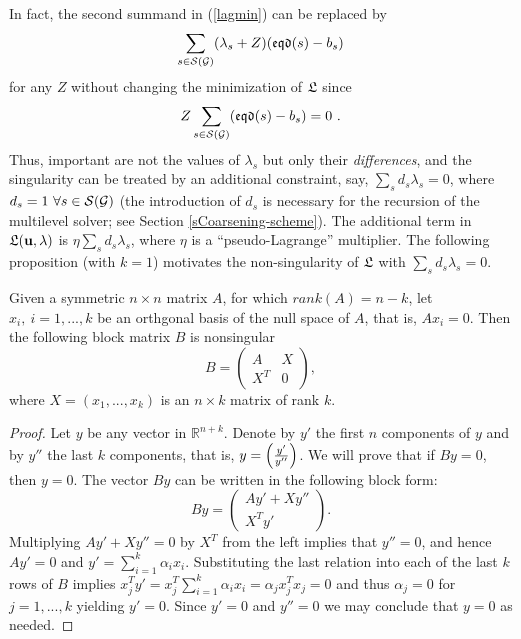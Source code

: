 \documentclass[final]{siamltex}
\begin{document}
In fact, the second summand in (\ref{lagmin})
can be replaced by
\[
\sum_{s\in  \mathcal{S}(\mathcal{G})} (\lambda_s+Z)(\mathfrak{eqd}(s)-b_s)
\]
for any $Z$ without changing the minimization of $\mathfrak{L}$ since
\[
Z\sum_{s\in  \mathcal{S}(\mathcal{G})} (\mathfrak{eqd}(s)-b_s)=0~.
\]
Thus, important are not the values of $\lambda_s$ but only their
{\it differences}, and the singularity can be treated by an
additional constraint, say, $\sum_s d_s \lambda_s=0$, where $d_s=1~
\forall s \in \mathcal{S}(\mathcal{G})$ (the introduction of $d_s$ is necessary for
the recursion of the multilevel solver; see Section
\ref{sCoarsening-scheme}). The additional term in
$\mathfrak{L}({\bf u},\lambda)$ is $\eta \sum_s d_s \lambda_s$, where $\eta$
is a ``pseudo-Lagrange'' multiplier. The following proposition
(with $k=1$) motivates the non-singularity of $\mathfrak{L}$ with $\sum_s
d_s \lambda_s=0$.
\begin{proposition}
Given a symmetric $n\times n$ matrix $A$, for which $rank(A)=n-k$, let $x_i,~ i=1,...,k$ be an orthgonal basis of the null space of
$A$, that is, $Ax_i=0$. Then the following block matrix $B$ is
nonsingular
\[
B=\left(
\begin{array}{c|c}
 A      & X \\
\hline
 X^T  & 0
\end{array}\right),
\]
where $X=(x_1,...,x_k)$ is an $n\times k$ matrix of rank $k$.
\end{proposition}
\vspace{3mm}
\begin{proof}
Let $y$ be any vector in $\mathbb{R}^{n+k}$. Denote by $y'$ the
first $n$ components of $y$ and by $y''$ the last $k$ components,
that is, $y=\left( {y'}\over{y''} \right)$. We will prove that if
$By=0$, then $y=0$. The vector $By$ can be written in the following
block form:
\[
By=\left(
\begin{array}{c}
 Ay'+Xy''\\
\hline
 X^Ty'
\end{array}\right).
\]
Multiplying $Ay'+Xy''=0$ by $X^T$ from the left implies that
$y''=0$, and hence $Ay'=0$ and $y'=\sum_{i=1}^k \alpha_i x_i$.
Substituting the last relation into each of the last $k$ rows of
$B$ implies $x_j^Ty'=x_j^T \sum_{i=1}^k \alpha_i
x_i=\alpha_jx_j^Tx_j=0$ and thus $\alpha_j=0$ for $j=1,...,k$
yielding $y'=0$. Since $y'=0$ and $y''=0$ we may conclude that
$y=0$ as needed.
\end{proof}
\end{document}
